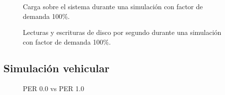 \begin{figure}[h]
    \centering
    
    \caption{Carga sobre el sistema durante una simulación con factor de demanda 100\%.}
    \label{fig:systemload:cpuram}
\end{figure}
\begin{figure}[h]
    \centering
    
    \caption[I/O en disco durante simulación]{Lecturas y escrituras de disco por segundo durante una simulación con factor de demanda 100\%.}
    \label{fig:systemload:io}
\end{figure} 


\subsection{Simulación vehicular}

\begin{figure}
    \centering
    
    \caption{PER 0.0 vs PER 1.0}
    \label{fig:per00per10timedistance}
\end{figure}
